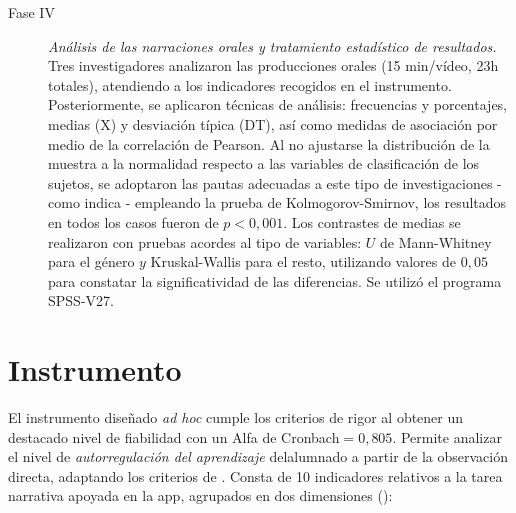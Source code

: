 \documentclass[spanish]{textolivre}
\begin{document}
\begin{description}
\item[Fase IV] \textit{Análisis de las narraciones orales y tratamiento
estadístico de resultados.} Tres investigadores analizaron las
producciones orales (15 min/vídeo, 23h totales), atendiendo a los
indicadores recogidos en el instrumento. Posteriormente, se aplicaron
técnicas de análisis: frecuencias y porcentajes, medias (X) y desviación
típica (DT), así como medidas de asociación por medio de la correlación
de Pearson. Al no ajustarse la distribución de la muestra a la
normalidad respecto a las variables de clasificación de los sujetos, se
adoptaron las pautas adecuadas a este tipo de investigaciones -como indica \textcite{siegel_estadistica_2005}- empleando la prueba de Kolmogorov-Smirnov, los resultados en todos los casos fueron de $p < 0,001$. Los
contrastes de medias se realizaron con pruebas acordes al tipo de
variables: $U$ de Mann-Whitney para el género $y$ Kruskal-Wallis para el
resto, utilizando valores de $0,05$ para constatar la significatividad de
las diferencias. Se utilizó el programa SPSS-V27.
\end{description}


\section{Instrumento}\label{sec-instrumento}
El instrumento diseñado \emph{ad hoc} cumple los criterios de rigor al
obtener un destacado nivel de fiabilidad con un Alfa de Cronbach$=0,805$.
Permite analizar el nivel de \emph{autorregulación del aprendizaje} delalumnado a partir de la observación directa, adaptando los criterios de \textcite{berridi_ramirez_estrategias_2017,requena_arellano_autorregulacion_2020}. Consta de 10 indicadores
relativos a la tarea narrativa apoyada en la app, agrupados en dos dimensiones ():
\end{document}
